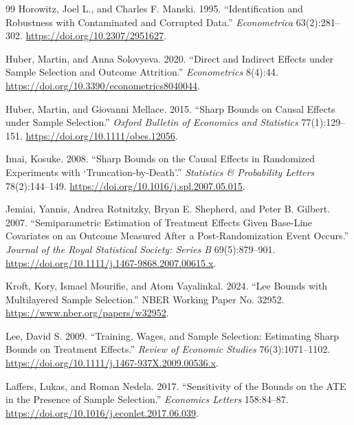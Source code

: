 \documentclass[11pt]{article}
\theoremstyle{definition}
\theoremstyle{plain}
\theoremstyle{remark}
\begin{document}
\begin{thebibliography}{99}
Horowitz, Joel L., and Charles F. Manski. 1995. ``Identification and Robustness with Contaminated and Corrupted Data.'' \emph{Econometrica} 63(2):281--302. \url{https://doi.org/10.2307/2951627}.

Huber, Martin, and Anna Solovyeva. 2020. ``Direct and Indirect Effects under Sample Selection and Outcome Attrition.'' \emph{Econometrics} 8(4):44. \url{https://doi.org/10.3390/econometrics8040044}.

Huber, Martin, and Giovanni Mellace. 2015. ``Sharp Bounds on Causal Effects under Sample Selection.'' \emph{Oxford Bulletin of Economics and Statistics} 77(1):129--151. \url{https://doi.org/10.1111/obes.12056}.

Imai, Kosuke. 2008. ``Sharp Bounds on the Causal Effects in Randomized Experiments with `Truncation-by-Death'.'' \emph{Statistics \& Probability Letters} 78(2):144--149. \url{https://doi.org/10.1016/j.spl.2007.05.015}.

Jemiai, Yannis, Andrea Rotnitzky, Bryan E. Shepherd, and Peter B. Gilbert. 2007. ``Semiparametric Estimation of Treatment Effects Given Base-Line Covariates on an Outcome Measured After a Post-Randomization Event Occurs.'' \emph{Journal of the Royal Statistical Society: Series B} 69(5):879--901. \url{https://doi.org/10.1111/j.1467-9868.2007.00615.x}.

Kroft, Kory, Ismael Mourifie, and Atom Vayalinkal. 2024. ``Lee Bounds with Multilayered Sample Selection.'' NBER Working Paper No. 32952. \url{https://www.nber.org/papers/w32952}.

Lee, David S. 2009. ``Training, Wages, and Sample Selection: Estimating Sharp Bounds on Treatment Effects.'' \emph{Review of Economic Studies} 76(3):1071--1102. \url{https://doi.org/10.1111/j.1467-937X.2009.00536.x}.

Laffers, Lukas, and Roman Nedela. 2017. ``Sensitivity of the Bounds on the ATE in the Presence of Sample Selection.'' \emph{Economics Letters} 158:84--87. \url{https://doi.org/10.1016/j.econlet.2017.06.039}.


\end{thebibliography}
\end{document}
